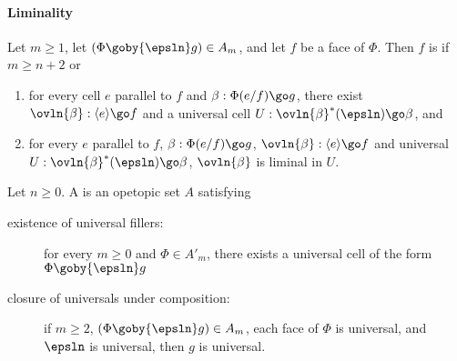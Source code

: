 \paragraph{Liminality}

Let $m\geq 1$, let $(\Phi \goby{\epsln} g) \in A_m$, and let $f$ be a face of
$\Phi$.  Then $f$ is  if $m\geq n+2$ or
%
\begin{enumerate}
\item 	\label{part:liminal-univ}
for every cell $e$ parallel to $f$ and $\beta: \Phi(e/f) \go g$, there
exist $\ovln{\beta}: \langle e\rangle \go f$ and a universal cell $U:
\ovln{\beta}^*(\epsln) \go \beta$, and
\item 	\label{part:liminal-liminal}
for every $e$ parallel to $f$, $\beta: \Phi(e/f) \go g$, $\ovln{\beta}:
\langle e\rangle \go f$  and universal $U: \ovln{\beta}^*(\epsln) \go \beta$,
$\ovln{\beta}$ is liminal in $U$.
\end{enumerate}



Let $n\geq 0$.  A  is an opetopic set $A$ satisfying
%
\begin{description}
\item[existence of universal fillers:] for every $m\geq 0$ and $\Phi \in
A'_m$, there exists a universal cell of the form $\Phi \goby{\epsln} g$
\item[closure of universals under composition:] if $m\geq 2$, $(\Phi
\goby{\epsln} g) \in A_m$, each face of $\Phi$ is universal, and $\epsln$ is
universal, then $g$ is universal.
\end{description}



\clearpage



